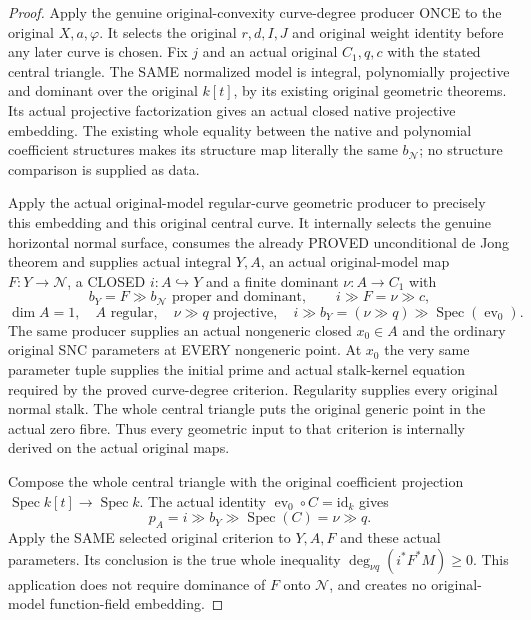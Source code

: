 \begin{proof}
Apply the genuine original-convexity curve-degree producer ONCE to the
original $X,a,\varphi$.  It selects the original $r,d,I,J$ and original
weight identity before any later curve is chosen.  Fix $j$ and an actual
original $C_1,q,c$ with the stated central triangle.  The SAME normalized
model is integral, polynomially projective and dominant over the original
$k[t]$, by its existing original geometric theorems.  Its actual
projective factorization gives an actual closed native projective
embedding.  The existing whole equality between the native and
polynomial coefficient structures makes its structure map literally the
same $b_{\mathcal N}$; no structure comparison is supplied as data.

Apply the actual original-model regular-curve geometric producer to
precisely this embedding and this original central curve.  It internally
selects the genuine horizontal normal surface, consumes the already
PROVED unconditional de Jong theorem and supplies actual integral
$Y,A$, an actual original-model map $F:Y\to\mathcal N$, a CLOSED
$i:A\hookrightarrow Y$ and a finite dominant $\nu:A\to C_1$ with
\[
 b_Y=F\gg b_{\mathcal N}\text{ proper and dominant},\qquad
 i\gg F=\nu\gg c,
\]
\[
 \dim A=1,\quad A\text{ regular},\quad\nu\gg q\text{ projective},
 \quad i\gg b_Y=(\nu\gg q)\gg\operatorname{Spec}(\operatorname{ev}_0).
\]
The same producer supplies an actual nongeneric closed $x_0\in A$ and
the ordinary original SNC parameters at EVERY nongeneric point.  At
$x_0$ the very same parameter tuple supplies the initial prime and
actual stalk-kernel equation required by the proved curve-degree
criterion.  Regularity supplies every original normal stalk.  The whole
central triangle puts the original generic point in the actual zero
fibre.  Thus every geometric input to that criterion is internally
derived on the actual original maps.

Compose the whole central triangle with the original coefficient
projection $\operatorname{Spec}k[t]\to\operatorname{Spec}k$.
The actual identity $\operatorname{ev}_0\circ C=\mathrm{id}_k$ gives
\[
 p_A=i\gg b_Y\gg\operatorname{Spec}(C)=\nu\gg q.
\]
Apply the SAME selected original criterion to $Y,A,F$ and
these actual parameters.  Its conclusion is the true whole inequality
$\deg_{\nu q}(i^*F^*M)\ge0$.  This application does not require dominance
of $F$ onto $\mathcal N$, and creates no original-model function-field
embedding.


\end{proof}
